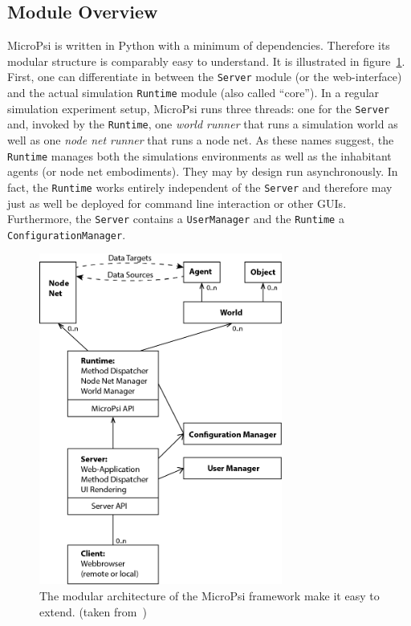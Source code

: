         \subsection{Module Overview}
MicroPsi is written in Python with a minimum of dependencies. Therefore its  modular structure is comparably easy to understand. It is illustrated in figure~\ref{micropsi2_modules}. First, one can differentiate in between the \texttt{Server} module (or the web-interface) and the actual simulation \texttt{Runtime} module (also called ``core''). In a regular simulation experiment setup, MicroPsi runs three threads: one for the \texttt{Server} and, invoked by the \texttt{Runtime}, one \emph{world runner} that runs a simulation world as well as one \emph{node net runner} that runs a node net. As these names suggest, the \texttt{Runtime} manages both the simulations environments as well as the inhabitant agents (or node net embodiments). They may by design run asynchronously. In fact, the \texttt{Runtime} works entirely independent of the \texttt{Server} and therefore may just as well be deployed for command line interaction or other GUIs. Furthermore, the \texttt{Server} contains a \texttt{UserManager} and the \texttt{Runtime} a \texttt{ConfigurationManager}.~\cite{conf/agi/Bach12}
\\          
          
\begin{figure}[h]
  \centering
    \includegraphics[width=8cm]{graphics/micropsi2_uml}
  \caption{The modular architecture of the MicroPsi framework make it easy to extend. (taken from~\cite{conf/agi/Bach12})}
  \label{micropsi2_modules}
\end{figure}


